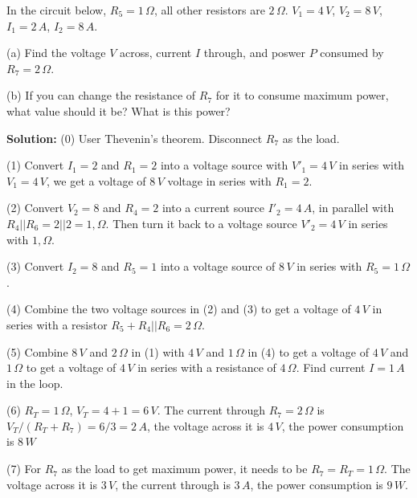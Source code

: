   In the circuit below, $R_5=1\,\Omega$, all other resistors are
  $2\,\Omega$. $V_1=4\,V$, $V_2=8\,V$, $I_1=2\,A$, $I_2=8\,A$.

  (a) Find the voltage $V$ across, current $I$ through, and poswer
  $P$ consumed by $R_7=2\,\Omega$.
  

  (b) If you can change the resistance of $R_7$ for it to consume
  maximum power, what value should it be? What is this power?



  {\bf Solution:} 
  (0) User Thevenin's theorem. Disconnect $R_7$ as the load.

  (1) Convert $I_1=2$ and $R_1=2$ into a voltage source with $V'_1=4\,V$
  in series with $V_1=4\,V$, we get a voltage of $8\,V$ voltage in series 
  with $R_1=2$. 
  
  (2) Convert $V_2=8$ and $R_4=2$ into a current source $I'_2=4\,A$, in 
  parallel with $R_4||R_6=2||2=1,\Omega$. Then turn it back to a voltage 
  source $V'_2=4\,V$ in series with $1,\Omega$. 

  (3) Convert $I_2=8$ and $R_5=1$ into a voltage source of $8\,V$ in series
  with $R_5=1\,\Omega$.

  (4) Combine the two voltage sources in (2) and (3) to get a voltage of 
  $4\,V$ in series with a resistor $R_5+R_4||R_6=2\,\Omega$.

  (5) Combine $8\,V$ and $2\,\Omega$ in (1) with $4\,V$ and $1\,\Omega$ 
  in (4) to get a voltage of $4\,V$ and $1\,\Omega$ to get a voltage of 
  $4\,V$ in series with a resistance of $4\,\Omega$. Find current $I=1\,A$
  in the loop.

  (6) $R_T=1\,\Omega$, $V_T=4+1=6\,V$. The current through $R_7=2\,\Omega$
  is $V_T/(R_T+R_7)=6/3=2\,A$, the voltage across it is $4\,V$, the power
  consumption is $8\,W$

  (7) For $R_7$ as the load to get maximum power, it needs to be 
  $R_7=R_T=1\,\Omega$. The voltage across it is $3\,V$, the current 
  through is $3\,A$, the power consumption is $9\,W$.

